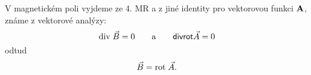       V magnetickém poli vyjdeme ze 4. MR a z jiné identity pro vektorovou funkci $\mathbf{A}$, známe z
      vektorové analýzy: $$\mathrm{div}\;\vec{B} = 0 \qquad \text{a} \qquad \textsf{div}\textsf{rot}\vec{A} =
      0$$ odtud
        \begin{equation}\label{TEMP:eq_B_rotA}
          \vec{B} = \mathrm{rot}\;\vec{A}.
        \end{equation}       
               
\printbibliography[title={Seznam literatury}, heading=subbibliography]
